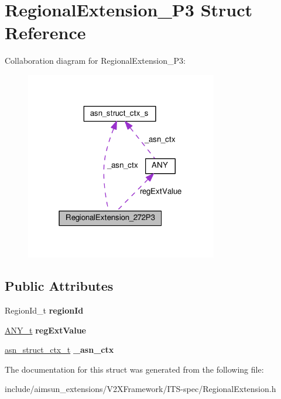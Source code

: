 \hypertarget{structRegionalExtension__272P3}{}\section{Regional\+Extension\+\_\+P3 Struct Reference}
\label{structRegionalExtension__272P3}


Collaboration diagram for Regional\+Extension\+\_\+P3\+:\nopagebreak
\begin{figure}[H]
\begin{center}
\leavevmode
\includegraphics[width=238pt]{structRegionalExtension__272P3__coll__graph}
\end{center}
\end{figure}
\subsection*{Public Attributes}
\begin{DoxyCompactItemize}
\item 
Region\+Id\+\_\+t {\bfseries region\+Id}\hypertarget{structRegionalExtension__272P3_ae7802002da1624cbf308548e670471b2}{}\label{structRegionalExtension__272P3_ae7802002da1624cbf308548e670471b2}

\item 
\hyperlink{structANY}{A\+N\+Y\+\_\+t} {\bfseries reg\+Ext\+Value}\hypertarget{structRegionalExtension__272P3_a0fbf46ac690a08bd55194bc0cdbc52e0}{}\label{structRegionalExtension__272P3_a0fbf46ac690a08bd55194bc0cdbc52e0}

\item 
\hyperlink{structasn__struct__ctx__s}{asn\+\_\+struct\+\_\+ctx\+\_\+t} {\bfseries \+\_\+asn\+\_\+ctx}\hypertarget{structRegionalExtension__272P3_aa08d1eb6133545d2a1ed76d0f3a8a9eb}{}\label{structRegionalExtension__272P3_aa08d1eb6133545d2a1ed76d0f3a8a9eb}

\end{DoxyCompactItemize}


The documentation for this struct was generated from the following file\+:\begin{DoxyCompactItemize}
\item 
include/aimsun\+\_\+extensions/\+V2\+X\+Framework/\+I\+T\+S-\/spec/Regional\+Extension.\+h\end{DoxyCompactItemize}
